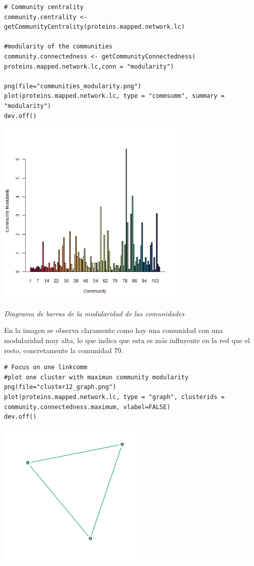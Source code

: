 \begin{lstlisting}
# Community centrality
community.centrality <- getCommunityCentrality(proteins.mapped.network.lc)

#modularity of the communities
community.connectedness <- getCommunityConnectedness(
proteins.mapped.network.lc,conn = "modularity") 

png(file="communities_modularity.png")
plot(proteins.mapped.network.lc, type = "commsumm", summary = "modularity")
dev.off()
\end{lstlisting}
\begin{center}
\includegraphics[width=90mm,scale=1]{report/figures/communities_modularity.png}

\caption{\textit{Diagrama de barras de la modularidad de las comunidades}}

\end{center}
En la imagen se observa claramente como hay una comunidad con una modularidad muy alta, lo que indica que esta es más influyente en la red que el resto, concretamente la comunidad 79.


\begin{lstlisting}
# Focus on one linkcomm
#plot one cluster with maximun community modularity
png(file="cluster12_graph.png")
plot(proteins.mapped.network.lc, type = "graph", clusterids =
community.connectedness.maximum, vlabel=FALSE)
dev.off()

\end{lstlisting}

\begin{center}
\includegraphics[width=70mm,scale=1]{report/figures/cluster_graph.png}
\end{center}

